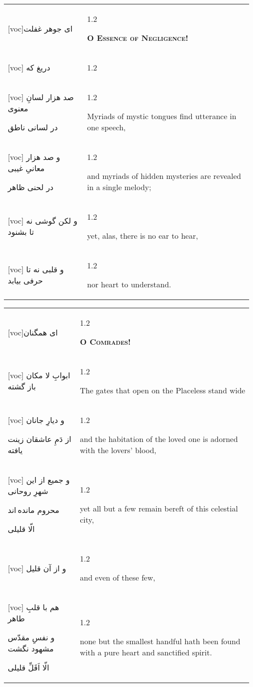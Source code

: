 \documentclass[11pt]{article}
\makeatletter
\newenvironment{orig}
  {\begin{farsi}[voc]}
  {\end{farsi}}
\newenvironment{trans}
  {\Large\begin{spacing}{1.2}\raggedright}
  {\end{spacing}}
\newenvironment{word}
  {\begin{tabular}[t]{p{2.75in}@{\hspace{3em}}p{2.75in}}}
  {\end{tabular}}
\newcommand{\ayat}[2]{\begin{orig}#1\end{orig} & \begin{trans}#2\end{trans}}
\newcommand{\heading}[2]{\textsc{\textbf{#1}} %
}
\makeatother
\begin{document}
\pagebreak

\begin{word}
\ayat{ای جوهر غفلت}{\heading{O Essence of Negligence!}{}} \\ \ayat{
دريغ که
}{} \vspace{-1ex}\\ \ayat{
صد هزار لسانِ معنوی

در لسانی ناطق
}{Myriads of mystic tongues find utterance in one speech,} \\ \ayat{
و صد هزار معانیِ غيبی

در لحنی ظاهر
}{and myriads of hidden mysteries are revealed in a single melody;} \\ \ayat{
و لکن گوشی نه تا بشنود
}{yet, alas, there is no ear to hear,} \vspace{-1ex}\\ \ayat{
و قلبی نه تا حرفی بيابد
}{nor heart to understand.}
\end{word}

\pagebreak

\begin{word}
\ayat{ای همگنان}{\heading{O Comrades!}{}} \\ \ayat{
ابوابِ لا مکان باز گشته
}{The gates that open on the Placeless stand wide} \vspace{-1ex}\\ \ayat{
و ديارِ جانان

از دَمِ عاشقان زينت يافته
}{and the habitation of the loved one is adorned with the lovers'
  blood,} \\ \ayat{
و جميع از اين شهرِ روحانی

محروم مانده اند

الّا قليلی
}{yet all but a few remain bereft of this celestial city,} \\ \ayat{
و از آن قليل
}{and even of these few,} \vspace{-1ex}\\ \ayat{
هم با قلبِ طاهر

و نفسِ مقدّس مشهود نگشت

الّا اَقَلِّ قليلی
}{none but the smallest handful hath been found with a pure heart and
  sanctified spirit.}
\end{word}

\pagebreak
\end{document}
